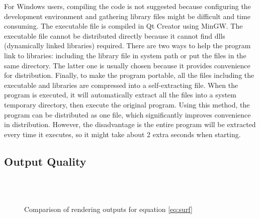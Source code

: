 For Windows users, compiling the code is not suggested because configuring the development environment and gathering library files might be difficult and time consuming. The executable file is compiled in Qt Creator using MinGW. The executable file cannot be distributed directly because it cannot find dlls (dynamically linked libraries) required. There are two ways to help the program link to libraries: including the library file in system path or put the files in the same directory. The latter one is usually chosen because it provides convenience for distribution. Finally, to make the program portable, all the files including the executable and libraries are compressed into a self-extracting file. When the program is executed, it will automatically extract all the files into a system temporary directory, then execute the original program. Using this method, the program can be distributed as one file, which significantly improves convenience in distribution. However, the disadvantage is the entire program will be extracted every time it executes, so it might take about 2 extra seconds when starting.

\subsection{Output Quality}

\begin{figure}[!tbp]
	\centering
	 \hspace{0.5em}
	 \\
	 \hspace{0.5em}
	 \\
	 \hspace{0.5em}
	\caption{Comparison of rendering outputs for equation \ref{eq:surf}}
	\label{fig:comp}
\end{figure}

